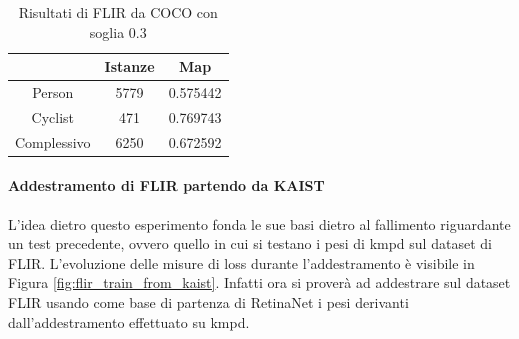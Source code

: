 \begin{table}[]
    \centering
    \begin{tabular}{c|c|c|}
    \cline{2-3}
     & Istanze & Map \\ \hline
    \multicolumn{1}{|c|}{Person} & 5779 & 0.575442 \\ \hline
    \multicolumn{1}{|c|}{Cyclist} & 471 & 0.769743 \\ \hline
    \multicolumn{1}{|c|}{Complessivo} & 6250 & 0.672592 \\ \hline
    \end{tabular}
    \caption{Risultati di FLIR da COCO con soglia $0.3$}
    \label{table:coco_result_best_flir}
\end{table}


\paragraph{Addestramento di FLIR partendo da KAIST}
L'idea dietro questo esperimento fonda le sue basi dietro al fallimento riguardante un test precedente, ovvero quello in cui si testano i pesi di \ac{kmpd} sul dataset di FLIR. L'evoluzione delle misure di loss durante l'addestramento è visibile in Figura \ref{fig:flir_train_from_kaist}. Infatti ora si proverà ad addestrare sul dataset FLIR usando come base di partenza di RetinaNet i pesi derivanti dall'addestramento effettuato su \ac{kmpd}.

